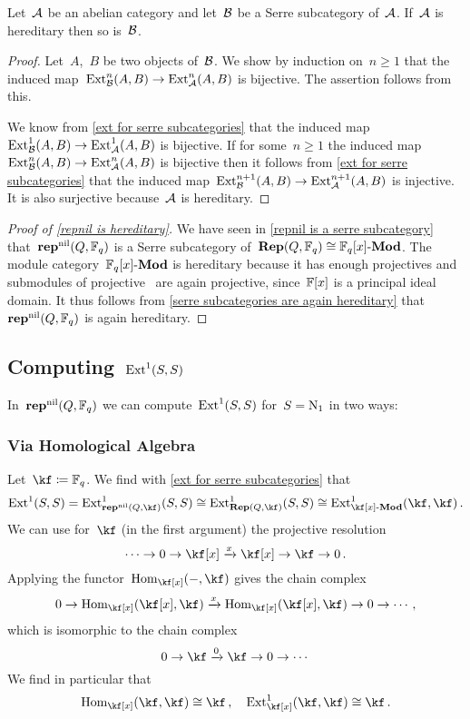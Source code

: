 \documentclass[a4paper,11pt]{scrartcl}
\begin{document}
\begin{corollary}
  \label{serre subcategories are again hereditary}
  Let~$\mathcal{A}$ be an abelian category and let~$\mathcal{B}$ be a Serre subcategory of~$\mathcal{A}$.
  If~$\mathcal{A}$ is hereditary then so is~$\mathcal{B}$.
\end{corollary}

\begin{proof}
  Let~$A$,~$B$ be two objects of~$\mathcal{B}$.
  We show by induction on~$n \geq 1$ that the induced map~$\operatorname{Ext}^n_{\mathcal{B}}(A,B) \to \operatorname{Ext}^n_{\mathcal{A}}(A,B)$ is bijective.
  The assertion follows from this.

  We know from \cref{ext for serre subcategories} that the induced map~$\operatorname{Ext}^1_{\mathcal{B}}(A,B) \to \operatorname{Ext}^1_{\mathcal{A}}(A,B)$ is bijective.
  If for some~$n \geq 1$ the induced map~$\operatorname{Ext}^n_{\mathcal{B}}(A,B) \to \operatorname{Ext}^n_{\mathcal{A}}(A,B)$ is bijective then it follows from \cref{ext for serre subcategories} that the induced map~$\operatorname{Ext}^{n+1}_{\mathcal{B}}(A,B) \to \operatorname{Ext}^{n+1}_{\mathcal{A}}(A,B)$ is injective.
  It is also surjective because~$\mathcal{A}$ is hereditary.
\end{proof}

\begin{proof}[Proof of \cref{repnil is hereditary}]
  We have seen in \cref{repnil is a serre subcategory} that~$\mathbf{rep}^{\mathrm{nil}}(Q, \mathbb{F}_q)$ is a Serre subcategory of~$\mathbf{Rep}(Q, \mathbb{F}_q) \cong \mathbb{F}_q[x]\textrm{-}\mathbf{Mod}$.
  The module category~$\mathbb{F}_q[x]\textrm{-}\mathbf{Mod}$ is hereditary because it has enough projectives and submodules of projective~ are again projective, since~$\mathbb{F}[x]$ is a principal ideal domain.
  It thus follows from \cref{serre subcategories are again hereditary} that~$\mathbf{rep}^{\mathrm{nil}}(Q, \mathbb{F}_q)$ is again hereditary.
\end{proof}


\subsection{Computing~$\operatorname{Ext}^1(S,S)$}
\label{computing ext}

In~$\mathbf{rep}^{\mathrm{nil}}(Q, \mathbb{F}_q)$ we can compute~$\operatorname{Ext}^1(S,S)$ for~$S = \mathrm{N}_1$ in two ways:

\subsubsection{Via Homological Algebra}

Let~$\kf \defined \Finite_q$.
We find with \cref{ext for serre subcategories} that
\[
  \Ext^1(S,S)
  =
  \Ext^1_{\repnil(Q, \kf)}(S,S)
  \cong
  \Ext^1_{\Rep(Q, \kf)}(S, S)
  \cong
  \Ext^1_{\Mod{\kf[x]}}( \kf, \kf ) \,.
\]
We can use for~$\kf$ (in the first argument) the projective resolution
\[
  \dotsb
  \to
  0
  \to
  \kf[x]
  \xto{x}
  \kf[x]
  \to
  \kf
  \to
  0 \,.
\]
Applying the functor~$\Hom_{\kf[x]}(-, \kf)$ gives the chain complex
\[
  0
  \to
  \Hom_{\kf[x]}( \kf[x], \kf )
  \xto{x}
  \Hom_{\kf[x]}( \kf[x], \kf )
  \to
  0
  \to
  \dotsb \,,
\]
which is isomorphic to the chain complex
\[
  0
  \to
  \kf
  \xto{0}
  \kf
  \to
  0
  \to
  \dotsb
\]
We find in particular that
\[
  \Hom_{\kf[x]}(\kf, \kf) \cong \kf \,,
  \quad
  \Ext^1_{\kf[x]}(\kf, \kf) \cong \kf \,.
\]
\end{document}
